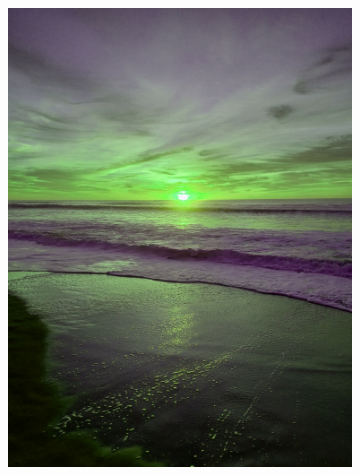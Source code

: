 \documentclass[12pt, a4paper]{article}
\begin{document}
\begin{figure}[!h]
\begin{subfigure}[b]{0.3\textwidth}
          \includegraphics[width=1\textwidth]{report_src/art/green_ray.jpeg}
      \end{subfigure}
      \begin{subfigure}[b]{0.3\textwidth}

\end{subfigure}
\end{figure}
\end{document}
